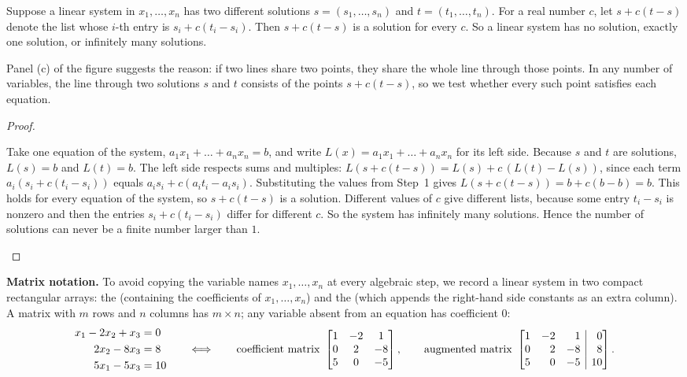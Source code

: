 \documentclass[10pt]{scrartcl}
\makeatletter
\newcommand{\aug}[2]{\left[\begin{array}{@{}#1@{}}#2\end{array}\right]}
\makeatother
\begin{document}
\begin{proposition*}
  Suppose a linear system in $x_1,\dots,x_n$ has two different solutions $s=(s_1,\dots,s_n)$ and $t=(t_1,\dots,t_n)$. For a real number $c$, let $s+c(t-s)$ denote the list whose $i$-th entry is $s_i+c(t_i-s_i)$. Then $s+c(t-s)$ is a solution for every $c$. So a linear system has no solution, exactly one solution, or infinitely many solutions.
\end{proposition*}
\begin{ideabox}
  Panel (c) of the figure suggests the reason: if two lines share two points, they share the whole line through those points. In any number of variables, the line through two solutions $s$ and $t$ consists of the points $s+c(t-s)$, so we test whether every such point satisfies each equation.
\end{ideabox}
\begin{proof}
  \begin{steps}
    \ii Take one equation of the system, $a_1x_1+\dots+a_nx_n=b$, and write $L(x)=a_1x_1+\dots+a_nx_n$ for its left side. Because $s$ and $t$ are solutions, $L(s)=b$ and $L(t)=b$.
    \ii The left side respects sums and multiples: $L(s+c(t-s))=L(s)+c\,(L(t)-L(s))$, since each term $a_i(s_i+c(t_i-s_i))$ equals $a_is_i+c(a_it_i-a_is_i)$.
    \ii Substituting the values from Step~1 gives $L(s+c(t-s))=b+c(b-b)=b$. This holds for every equation of the system, so $s+c(t-s)$ is a solution.
    \ii Different values of $c$ give different lists, because some entry $t_i-s_i$ is nonzero and then the entries $s_i+c(t_i-s_i)$ differ for different $c$. So the system has infinitely many solutions. Hence the number of solutions can never be a finite number larger than $1$.
  \end{steps}
\end{proof}

\textbf{Matrix notation.} To avoid copying the variable names $x_1,\dots,x_n$ at every algebraic step, we record a linear system in two compact rectangular arrays: the  (containing the coefficients of $x_1,\dots,x_n$) and the  (which appends the right-hand side constants as an extra column). A matrix with $m$ rows and $n$ columns has  $m\times n$; any variable absent from an equation has coefficient $0$:
\[
  \begin{aligned}
    x_1 - 2x_2 + x_3 &= 0 \\
    2x_2 - 8x_3 &= 8 \\
    5x_1 - 5x_3 &= 10
  \end{aligned}
  \qquad\Longleftrightarrow\qquad
  \text{coefficient matrix }
  \begin{bmatrix} 1 & -2 & 1 \\ 0 & 2 & -8 \\ 5 & 0 & -5 \end{bmatrix},
  \qquad
  \text{augmented matrix }
  \aug{rrr|r}{1 & -2 & 1 & 0 \\ 0 & 2 & -8 & 8 \\ 5 & 0 & -5 & 10}.
\]
\end{document}
